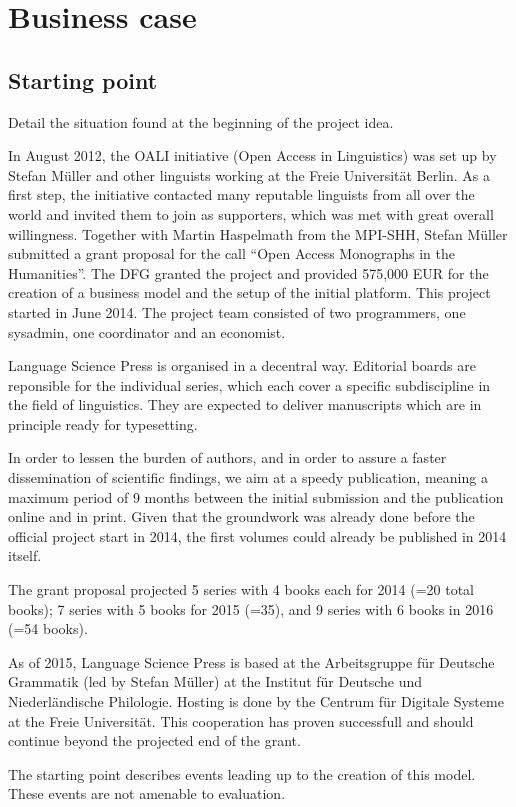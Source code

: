 \documentclass[nonflat,smallfont
]{langsci/langscibook}
\newcommand{\background}[1]{ 
  \vspace{5mm}
  \renewcommand{\tblslinecolour}{lsDarkBlue}
  \tblssy[red]{explore2}{Background}{\vspace*{-5mm}#1}
}
\newcommand{\langscisolution}[1]{
  \renewcommand{\tblslinecolour}{lsLightBlue}
  \tblssy{langsci}{LangSci solution}{\vspace*{-5mm}#1}
}
\newcommand{\evaluation}[1]{
  \renewcommand{\tblslinecolour}{lsLightOrange}
  \tblssy{receipt}{Evaluation}{\vspace*{-5mm}#1}
}
\renewcommand{\tblssy}[4][black!12]{%
  \renewcommand{\langscisymbol}{#2}\renewcommand{\tblsboxcolor}{#1}
  \begin{mdframed}[style=yellowexercise,frametitle={#3}]
    #4
  \end{mdframed}
}
\begin{document}
\chapter{Business case}
\section{Starting point}
\background{
Detail the situation found at the beginning of the project idea. 

}
\langscisolution{
In August 2012, the OALI initiative (Open Access in Linguistics) was set up by Stefan Müller and other linguists working at the Freie Universität Berlin. As a first step, the initiative contacted many reputable linguists from all over the world and invited them to join as supporters, which was met with great overall willingness. Together with Martin Haspelmath from the MPI-SHH, Stefan Müller submitted a grant proposal for the call  ``Open Access Monographs in the Humanities''. 
The DFG granted the project and provided 575,000 EUR for the creation of a business model and the setup of the initial platform. 
This project started in June 2014. The project team consisted of two programmers, one sysadmin, one coordinator and an economist. 

Language Science Press is organised in a decentral way. Editorial boards are reponsible for the individual series, which each cover a specific subdiscipline in the field of linguistics.  They are expected to deliver manuscripts which are in principle ready for typesetting. 

In order to lessen the burden of authors, and in order to assure a faster dissemination of scientific findings, we aim at a speedy publication, meaning a maximum period of 9 months between the initial submission and the publication online and in print. Given that the groundwork was already done before the official project start in 2014, the first volumes could already be published in 2014 itself. 

The grant proposal projected 5 series with 4 books each for 2014 (=20 total books); 7 series with 5 books for 2015 (=35), and 9 series with 6 books in 2016 (=54 books). 
 
As of 2015, Language Science Press is based at the Arbeitsgruppe für Deutsche Grammatik (led by Stefan Müller) at the Institut für Deutsche und Niederländische Philologie. Hosting is done by the Centrum für Digitale Systeme at the Freie Universität. This cooperation has proven successfull and should continue beyond the projected end of the grant.
} 
\evaluation{The starting point describes events leading up to the creation of this model. These events are not amenable to evaluation.}
\end{document}
